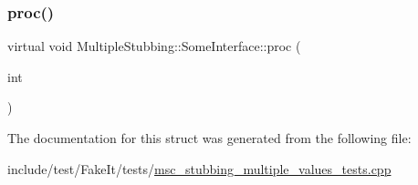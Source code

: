 \subsubsection{\texorpdfstring{proc()}{proc()}}
{\footnotesize\ttfamily virtual void Multiple\+Stubbing\+::\+Some\+Interface\+::proc (\begin{DoxyParamCaption}\item[{int}]{ }\end{DoxyParamCaption})\hspace{0.3cm}{\ttfamily [pure virtual]}}



The documentation for this struct was generated from the following file\+:\begin{DoxyCompactItemize}
\item 
include/test/\+Fake\+It/tests/\mbox{\hyperlink{msc__stubbing__multiple__values__tests_8cpp}{msc\+\_\+stubbing\+\_\+multiple\+\_\+values\+\_\+tests.\+cpp}}\end{DoxyCompactItemize}
